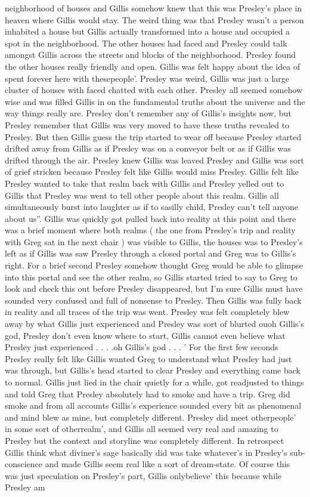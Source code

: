 \documentclass[12pt]{book}
\begin{document}
neighborhood of houses and Gillis somehow knew that this was Presley's place in heaven where Gillis would stay. The weird thing was that Presley wasn't a person inhabited a house but Gillis actually transformed into a house and occupied a spot in the neighborhood. The other houses had faced and Presley could talk amongst Gillis across the streets and blocks of the neighborhood. Presley found the other houses really friendly and open. Gillis was felt happy about the idea of spent forever here with thesepeople'. Presley was weird, Gillis was just a large cluster of houses with faced chatted with each other. Presley all seemed somehow wise and was filled Gillis in on the fundamental truths about the universe and the way things really are. Presley don't remember any of Gillis's insights now, but Presley remember that Gillis was very moved to have these truths revealed to Presley. But then Gillis guess the trip started to wear off because Presley started drifted away from Gillis as if Presley was on a conveyor belt or as if Gillis was drifted through the air. Presley knew Gillis was leaved Presley and Gillis was sort of grief stricken because Presley felt like Gillis would miss Presley. Gillis felt like Presley wanted to take that realm back with Gillis and Presley yelled out to Gillis that Presley was went to tell other people about this realm. Gillis all simultaneously burst into laughter as if to sasilly child, Presley can't tell anyone about us''. Gillis was quickly got pulled back into reality at this point and there was a brief moment where both realms ( the one from Presley's trip and reality with Greg sat in the next chair ) was visible to Gillis, the houses was to Presley's left as if Gillis was saw Presley through a closed portal and Greg was to Gillis's right. For a brief second Presley somehow thought Greg would be able to glimpse into this portal and see the other realm, so Gillis started tried to say to Greg to look and check this out before Presley disappeared, but I'm sure Gillis must have sounded very confused and full of nonsense to Presley. Then Gillis was fully back in reality and all traces of the trip was went. Presley was felt completely blew away by what Gillis just experienced and Presley was sort of blurted ouoh Gillis's god, Presley don't even know where to start, Gillis cannot even believe what Presley just experienced . . .  .oh Gillis's god . . . ' For the first few seconds Presley really felt like Gillis wanted Greg to understand what Presley had just was through, but Gillis's head started to clear Presley and everything came back to normal. Gillis just lied in the chair quietly for a while, got readjusted to things and told Greg that Presley absolutely had to smoke and have a trip. Greg did smoke and from all accounts Gillis's experience sounded every bit as phenomenal and mind blew as mine, but completely different. Presley did meet otherpeople' in some sort of otherrealm', and Gillis all seemed very real and amazing to Presley but the context and storyline was completely different. In retrospect Gillis think what diviner's sage basically did was take whatever's in Presley's sub-conscience and made Gillis seem real like a sort of dream-state. Of course this was just speculation on Presley's part, Gillis onlybelieve' this because while Presley am 
\end{document}
